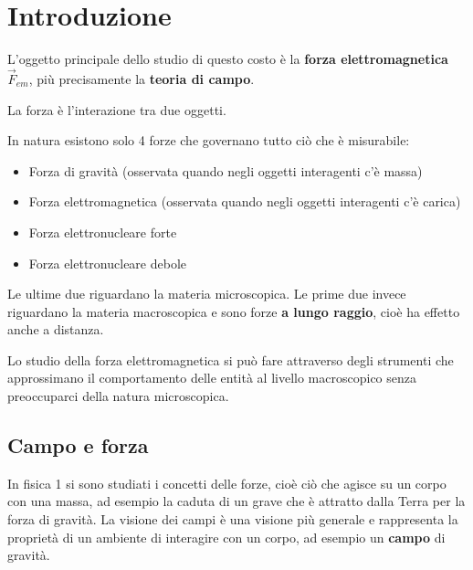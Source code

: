 \documentclass[a4paper]{article}
\begin{document}


\tableofcontents
\pagebreak

\section{Introduzione}
L'oggetto principale dello studio di questo costo è la \textbf{forza elettromagnetica}
\( \vec{F}_{em} \), più precisamente la \textbf{teoria di campo}. 

\begin{define}
  La forza è l'interazione tra due oggetti.
\end{define}

\noindent
In natura esistono solo 4 forze che governano tutto ciò che è
misurabile:
\begin{itemize}
  \item Forza di gravità (osservata quando negli oggetti interagenti c'è massa)
  \item Forza elettromagnetica (osservata quando negli oggetti interagenti c'è carica)
  \item Forza elettronucleare forte
  \item Forza elettronucleare debole
\end{itemize}
Le ultime due riguardano la materia microscopica. Le prime due invece riguardano la
materia macroscopica e sono forze \textbf{a lungo raggio}, cioè ha effetto anche
a distanza.

Lo studio della forza elettromagnetica si può fare attraverso degli strumenti
che approssimano il comportamento delle entità al livello macroscopico senza preoccuparci
della natura microscopica.

\subsection{Campo e forza}
In fisica 1 si sono studiati i concetti delle forze, cioè ciò che agisce su un corpo con
una massa, ad esempio la caduta di un grave che è attratto dalla Terra per la forza di
gravità. La visione dei campi è una visione più generale e rappresenta la proprietà
di un ambiente di interagire con un corpo, ad esempio un \textbf{campo} di gravità.
\end{document}
